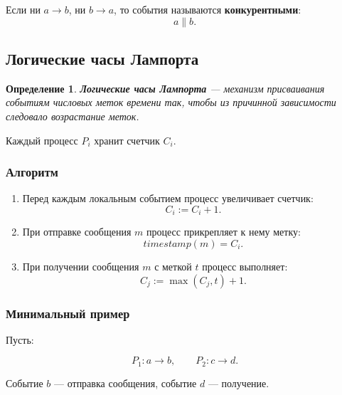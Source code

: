 \documentclass[12pt,a4paper]{article}
\newtheorem{definition}{Определение}
\begin{document}
Если ни $a \rightarrow b$, ни $b \rightarrow a$, то события называются \textbf{конкурентными}:
\[
a \parallel b.
\]

\subsection{Логические часы Лампорта}

\begin{definition}
\textbf{Логические часы Лампорта} --- механизм присваивания событиям числовых меток времени так, чтобы из причинной зависимости следовало возрастание меток.
\end{definition}

Каждый процесс $P_i$ хранит счетчик $C_i$.

\subsubsection{Алгоритм}

\begin{enumerate}
    \item Перед каждым локальным событием процесс увеличивает счетчик:
    \[
    C_i := C_i + 1.
    \]
    \item При отправке сообщения $m$ процесс прикрепляет к нему метку:
    \[
    timestamp(m) = C_i.
    \]
    \item При получении сообщения $m$ с меткой $t$ процесс выполняет:
    \[
    C_j := \max(C_j, t) + 1.
    \]
\end{enumerate}

\subsubsection{Минимальный пример}

Пусть:

\[
P_1: a \rightarrow b,\qquad P_2: c \rightarrow d.
\]

Событие $b$ --- отправка сообщения, событие $d$ --- получение.

\begin{center}
\end{center}
\end{document}
